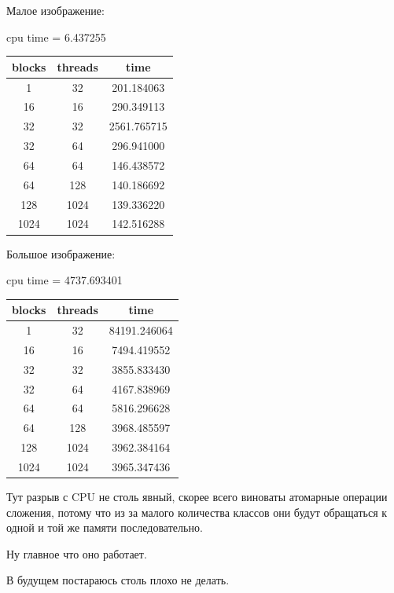 \documentclass[12pt]{article}
\begin{document}
Малое изображение:

\begin{center}
	cpu time = 6.437255
	\begin{table}[!htb]
		\centering
		\begin{tabular}{|c|c|c|}
			\hline
			blocks & threads & time        \\
			\hline

			1      & 32      & 201.184063  \\
			16     & 16      & 290.349113  \\
			32     & 32      & 2561.765715 \\
			32     & 64      & 296.941000  \\
			64     & 64      & 146.438572  \\
			64     & 128     & 140.186692  \\
			128    & 1024    & 139.336220  \\
			1024   & 1024    & 142.516288  \\
			\hline
		\end{tabular}
	\end{table}
\end{center}

Большое изображение:

\begin{center}
	cpu time = 4737.693401
	\begin{table}[!htb]
		\centering
		\begin{tabular}{|c|c|c|}
			\hline
			blocks & threads & time         \\
			\hline

			1      & 32      & 84191.246064 \\
			16     & 16      & 7494.419552  \\
			32     & 32      & 3855.833430  \\
			32     & 64      & 4167.838969  \\
			64     & 64      & 5816.296628  \\
			64     & 128     & 3968.485597  \\
			128    & 1024    & 3962.384164  \\
			1024   & 1024    & 3965.347436  \\
			\hline
		\end{tabular}
	\end{table}
\end{center}


Тут разрыв с CPU не столь явный, скорее всего виноваты атомарные операции сложения,
потому что из за малого количества классов они будут обращаться к одной и той же памяти
последовательно.

Ну главное что оно работает.

В будущем постараюсь столь плохо не делать.
\end{document}
